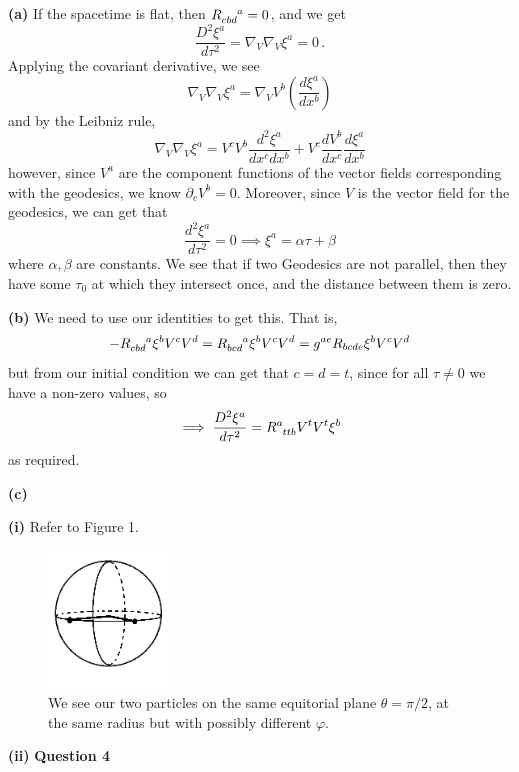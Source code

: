 \documentclass[10pt]{article}
\newcommand{\del}[2][]{\frac{d #1}{d #2}}
\begin{document}
\textbf{(a)} If the spacetime is flat, then $\tensor{R}{_{cbd}^{a}} = 0$, and we get
\[ \frac{D^{2}\xi^{a}}{d\tau^{2}} = \nabla_{V}\nabla_{V}\xi^{a} = 0\, .\]
Applying the covariant derivative, we see
\[ \nabla_{V}\nabla_{V}\xi^{a} = \nabla_{V}V^{b}\left(\del[\xi^{a}]{x^{b}}\right) \]
and by the Leibniz rule,
\[ \nabla_{V}\nabla_{V}\xi^{a} = V^{c}V^{b}\frac{d^{2} \xi^{a}}{dx^{c}dx^{b}} + V^{c}\del[V^{b}]{x^{c}}\del[\xi^{a}]{x^{b}}\]
however, since $V^{a}$ are the component functions of the vector fields corresponding with the geodesics, we know $\partial_{c}V^{b} = 0$. Moreover, since $V$ is the vector field for the geodesics, we can get that
\[ \frac{d^{2} \xi^{a}}{d\tau^{2}} = 0 \implies \xi^{a} = \alpha \tau + \beta \]
where $\alpha, \beta$ are constants. We see that if two Geodesics are not parallel, then they have some $\tau_{0}$ at which they intersect once, and the distance between them is zero. 

\textbf{(b)} We need to use our identities to get this. That is,
\[ -\tensor{R}{_{cbd}^{a}}\xi^{b}V^{c}V^{d} = \tensor{R}{_{bcd}^{a}}\xi^{b}V^{c}V^{d} = g^{ae}R_{bcde}\xi^{b}V^{c}V^{d} \]
but from our initial condition we can get that $c=d=t$, since for all $\tau \neq 0$ we have a non-zero values, so
\[ \implies \frac{D^{2} \xi^{a}}{d\tau^{2}} = \tensor{R}{^{a}_{ttb}}V^{t}V^{t}\xi^{b} \]
as required.

\newpage
\textbf{(c)}

\textbf{(i)} Refer to Figure 1. 
\begin{figure}
  \centering
  \includegraphics[width=0.3\textwidth]{Q3_c.png}
  \caption{We see our two particles on the same equitorial plane $\theta = \pi/2$, at the same radius but with possibly different $\varphi$.}
\end{figure}

\textbf{(ii)} 
\newpage
\textbf{Question 4}
\end{document}

